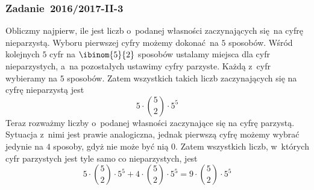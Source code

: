 \subsubsection*{Zadanie~2016/2017-II-3}
Obliczmy najpierw, ile jest liczb o~podanej własności zaczynających się na cyfrę nieparzystą. Wyboru pierwszej cyfry możemy dokonać na \(5\) sposobów. Wśród kolejnych \(5\) cyfr na \(\ibinom{5}{2}\) sposobów ustalamy miejsca dla cyfr nieparzystych, a~na pozostałych ustawimy cyfry parzyste. Każdą z~cyfr wybieramy na \(5\) sposobów. Zatem wszystkich takich liczb zaczynających się na cyfrę nieparzystą jest
\begin{equation*}
    5 \cdot \binom{5}{2} \cdot 5^5
\end{equation*}
Teraz rozważmy liczby o~podanej własności zaczynające się na cyfrę parzystą. Sytuacja z~nimi jest prawie analogiczna, jednak pierwszą cyfrę możemy wybrać jedynie na \(4\) sposoby, gdyż nie może być nią \(0\). Zatem wszystkich liczb, w~których cyfr parzystych jest tyle samo co nieparzystych, jest
\begin{equation*}
    5 \cdot \binom{5}{2} \cdot 5^5 + 4 \cdot \binom{5}{2} \cdot 5^5
    = 9 \cdot \binom{5}{2} \cdot 5^5
\end{equation*}

